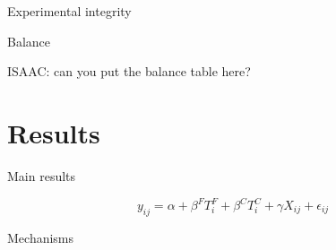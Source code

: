 \documentclass[8pt]{beamer}
\begin{document}
\begin{frame}{Experimental integrity}
    \begin{table}[H]
\caption{Attrition table}
\label{attrition_table}
\begin{center}
\scriptsize{}
\end{center}
\end{table}
\end{frame}


\begin{frame}{Balance}

\vfill ISAAC: can you put the balance table here?
    
\end{frame}


\section{Results}
\begin{frame}{Main results}
    
 \begin{equation*} \label{basic_reg}
    y_{ij} = \alpha + \beta^F T_{i}^F + \beta^C T_{i}^C + \gamma X_{ij} + \epsilon_{ij}
\end{equation*}

\begin{table}[H]
\caption{Main treatment effects}
\label{main_impact_table}
\begin{center}
\resizebox{0.95\textwidth}{!}{
\scriptsize{}
}
\end{center}
\end{table}
\end{frame}


\begin{frame}{Mechanisms}



\end{frame}
\end{document}
